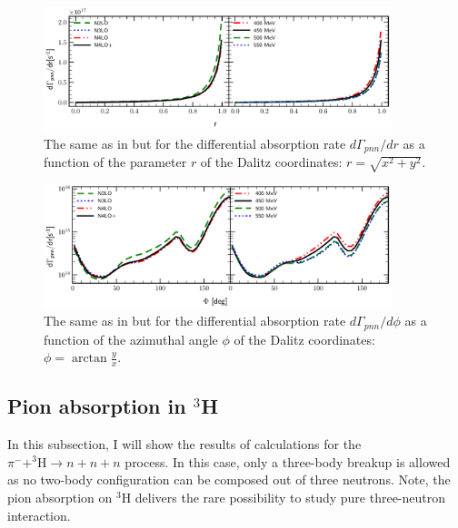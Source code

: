     \begin{figure}[h]
        \begin{center}
        \includegraphics[width=0.9\textwidth]{PlotData/PION/Dalitz_maps/figures/3HE_dGdr.pdf}
        \end{center}
        \caption{The same as in  but for the differential absorption rate $d\Gamma_{pnn} /dr$
        as a function of the parameter $r$ of the Dalitz coordinates: $r = \sqrt{x^2 + y^2}$.}
        \label{pion_dGdEr}
    \end{figure}

    \begin{figure}[h]
        \begin{center}
        \includegraphics[width=0.9\textwidth]{PlotData/PION/Dalitz_maps/figures/3HE_dGdphi.pdf}
        \end{center}
        \caption{The same as in  but for the differential absorption rate $d\Gamma_{pnn} /d\phi$
        as a function of the azimuthal angle $\phi$ of the Dalitz coordinates: $\phi = \arctan \frac{y}{x}$.}
        \label{pion_dGdphi}
    \end{figure}


    \clearpage
    \subsection{Pion absorption in $^3$H}

    In this subsection, I will show the results of calculations for
    the $\pi^- + ^3\text{H} \rightarrow n + n + n$ process.
    In this case, only a three-body breakup is allowed as 
    no two-body configuration can be composed out of three neutrons.
    Note, the pion absorption on $^3$H
    delivers the rare possibility to study pure three-neutron interaction.

